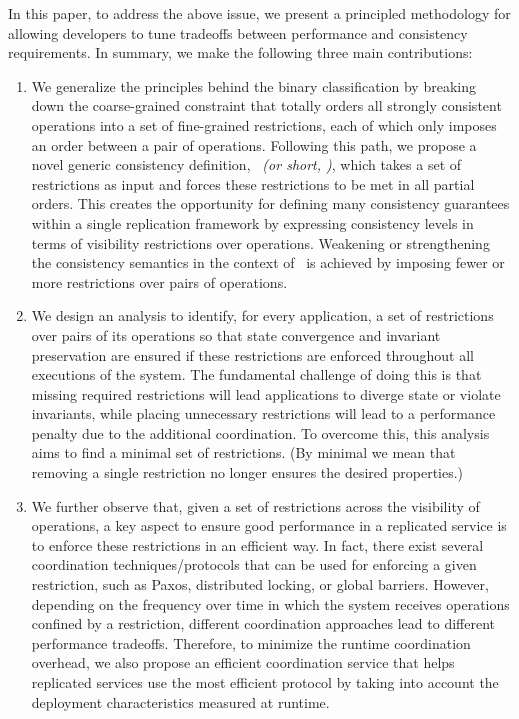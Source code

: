In this paper, to address the above issue, we present a principled
methodology for allowing developers to tune tradeoffs between
performance and consistency requirements.
In summary, we make the following three main contributions:
\begin{enumerate}
\item We generalize the principles
behind the binary classification by breaking down
the coarse-grained constraint that totally orders all strongly consistent operations
into a set of fine-grained restrictions, each of which only imposes an order between
a pair of operations. Following this path, we propose a novel generic consistency definition,
{\it \PRCNF\ (or short, \PRCN)}, which takes a set of restrictions
as input and forces these restrictions to be met in all partial orders. This creates the opportunity for defining many consistency
guarantees within a single replication framework by expressing consistency levels in terms of visibility
restrictions over operations. Weakening or strengthening the consistency semantics in the
context of \PRCN\ is achieved by imposing fewer or
more restrictions over pairs of operations.

\item We design an analysis to identify, for every application, a set of
restrictions over pairs of its operations so that state convergence and
invariant preservation are ensured if these restrictions are enforced throughout all
executions of the system. The fundamental challenge of doing this
is that missing required restrictions will lead applications to diverge state or violate invariants, while
placing unnecessary restrictions will lead to a performance penalty due to the additional coordination. To overcome
this, this analysis aims to find a minimal set of restrictions. (By minimal
we mean that removing a single restriction no longer ensures the desired properties.)

\item We further observe that, given a set of restrictions across the visibility of operations, a
key aspect to ensure good performance in a replicated service is to enforce these restrictions in an
efficient way. In fact, there exist several coordination techniques/protocols that can be used
for enforcing a given restriction, such as Paxos, distributed locking, or global barriers. However, depending on the
frequency over time in which the system receives operations confined by a restriction,
different coordination approaches lead to different performance tradeoffs.
Therefore, to minimize the runtime coordination overhead, we also propose
an efficient coordination service that helps replicated services
use the most efficient protocol by taking into account the deployment characteristics measured at runtime.
\end{enumerate}

